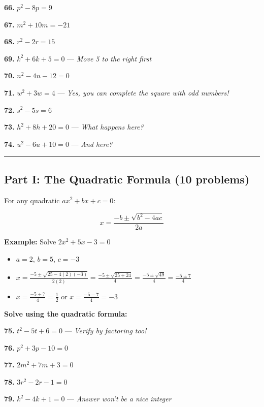 \documentclass[
  11pt,
]{article}
\providecommand{\tightlist}{%
  \setlength{\itemsep}{0pt}\setlength{\parskip}{0pt}}
\begin{document}
\textbf{66.} \(p^2 - 8p = 9\)

\textbf{67.} \(m^2 + 10m = -21\)

\textbf{68.} \(r^2 - 2r = 15\)

\textbf{69.} \(k^2 + 6k + 5 = 0\) --- \emph{Move 5 to the right first}

\textbf{70.} \(n^2 - 4n - 12 = 0\)

\textbf{71.} \(w^2 + 3w = 4\) --- \emph{Yes, you can complete the square
with odd numbers!}

\textbf{72.} \(s^2 - 5s = 6\)

\textbf{73.} \(h^2 + 8h + 20 = 0\) --- \emph{What happens here?}

\textbf{74.} \(u^2 - 6u + 10 = 0\) --- \emph{And here?}

\begin{center}\rule{0.5\linewidth}{0.5pt}\end{center}

\hypertarget{part-i-the-quadratic-formula-10-problems}{%
\subsection{Part I: The Quadratic Formula (10
problems)}\label{part-i-the-quadratic-formula-10-problems}}

For any quadratic \(ax^2 + bx + c = 0\):

\[\boxed{x = \frac{-b \pm \sqrt{b^2 - 4ac}}{2a}}\]

\textbf{Example:} Solve \(2x^2 + 5x - 3 = 0\)

\begin{itemize}
\tightlist
\item
  \(a = 2\), \(b = 5\), \(c = -3\)
\item
  \(x = \frac{-5 \pm \sqrt{25 - 4(2)(-3)}}{2(2)} = \frac{-5 \pm \sqrt{25 + 24}}{4} = \frac{-5 \pm \sqrt{49}}{4} = \frac{-5 \pm 7}{4}\)
\item
  \(x = \frac{-5 + 7}{4} = \frac{1}{2}\) or
  \(x = \frac{-5 - 7}{4} = -3\)
\end{itemize}

\textbf{Solve using the quadratic formula:}

\textbf{75.} \(t^2 - 5t + 6 = 0\) --- \emph{Verify by factoring too!}

\textbf{76.} \(p^2 + 3p - 10 = 0\)

\textbf{77.} \(2m^2 + 7m + 3 = 0\)

\textbf{78.} \(3r^2 - 2r - 1 = 0\)

\textbf{79.} \(k^2 - 4k + 1 = 0\) --- \emph{Answer won't be a nice
integer}
\end{document}
